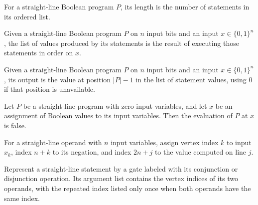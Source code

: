 \begin{definition}
\label{BoolCircuit.StraightLineProgram.length}
\leanok
For a straight-line Boolean program $P$, its length is the number of statements in its
ordered list.
\end{definition}

\begin{definition}
\label{BoolCircuit.StraightLineProgram.values}
\leanok
{}
Given a straight-line Boolean program $P$ on $n$ input bits and an input
$x\in\{0,1\}^n$, the list of values produced by its statements is the result of
executing those statements in order on $x$.
\end{definition}

\begin{definition}
\label{BoolCircuit.StraightLineProgram.eval}
\leanok
{}
Given a straight-line Boolean program $P$ on $n$ input bits and an input
$x\in\{0,1\}^n$, its output is the value at position $|P|-1$ in the list of statement
values, using $0$ if that position is unavailable.
\end{definition}

\begin{theorem}
\label{BoolCircuit.StraightLineProgram.eval_of_zero}
\leanok
{}
Let $P$ be a straight-line program with zero input variables, and let $x$ be an
assignment of Boolean values to its input variables. Then the evaluation of $P$ at $x$
is false.
\end{theorem}

\begin{definition}
\label{BoolCircuit.SLOperand.vertex}
\leanok
{}
For a straight-line operand with $n$ input variables, assign vertex index $k$ to input
$x_k$, index $n+k$ to its negation, and index $2n+j$ to the value computed on line $j$.
\end{definition}

\begin{definition}
\label{BoolCircuit.SLStmt.toGate}
\leanok
{}
Represent a straight-line statement by a gate labeled with its conjunction or
disjunction operation. Its argument list contains the vertex indices of its two
operands, with the repeated index listed only once when both operands have the same
index.
\end{definition}

